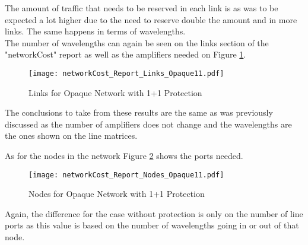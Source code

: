\documentclass[12pt, a4paper]{article}
\begin{document}
	The amount of traffic that needs to be reserved in each link is as was to be expected a lot higher due to the need to reserve double the amount and in more links. The same happens in terms of wavelengths. \\
	
%	
%	
	
	The number of wavelengths can again be seen on the links section of the "networkCost" report as well as the amplifiers needed on Figure \ref{networkCost_Report_Links_Opaque11}.
	
	\begin{figure}[h!]
		\centering
		\texttt{[image: networkCost\_Report\_Links\_Opaque11.pdf]}	
		\caption{Links for Opaque Network with 1+1 Protection}
		\label{networkCost_Report_Links_Opaque11}								
	\end{figure}	
	
	The conclusions to take from these results are the same as was previously discussed as the number of amplifiers does not change and the wavelengths are the ones shown on the line matrices.
	
	As for the nodes in the network Figure \ref{networkCost_Report_Nodes_Opaque11} shows the ports needed.
	
	\begin{figure}[h!]
		\centering
		\texttt{[image: networkCost\_Report\_Nodes\_Opaque11.pdf]}	
		\caption{Nodes for Opaque Network with 1+1 Protection}
		\label{networkCost_Report_Nodes_Opaque11}								
	\end{figure}		
	
	Again, the difference for the case without protection is only on the number of line ports as this value is based on the number of wavelengths going in or out of that node.
	
\end{document}
